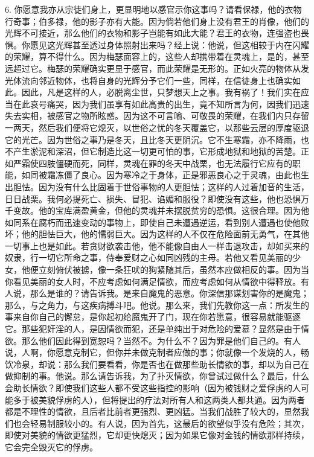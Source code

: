 6. 你愿意我亦从宗徒们身上，更显明地以感官示你这事吗？请看保禄，他的衣物行奇事；伯多禄，他的影子亦有大能。因为倘若他们身上没有君王的肖像，他们的光辉不可接近，那么他们的衣物和影子岂能有如此大能？君王的衣物，连强盗也畏惧。你愿见这光辉甚至透过身体照射出来吗？经上说：他说，但这相较于内在闪耀的荣耀，算不得什么。因为梅瑟面容上的，这些人却携带着在灵魂上，是的，甚至远超过它。梅瑟的荣耀确实更显于感官，而此荣耀是无形的。正如火亮的物体从发光体流向邻近物体，也将自身的光辉分予它们一些，同样，在信徒身上也确实如此。因此，凡是这样的人，必脱离尘世，只梦想天上之事。我有祸了！我们实在应当在此哀号痛哭，因为我们虽享有如此高贵的出生，竟不知所言为何，因我们迅速失去实相，被感官之物所眩惑。因为这不可言喻、可敬畏的荣耀，在我们内只存留一两天，然后我们便将它熄灭，以世俗之忧的冬天覆盖它，以那些云层的厚度驱退它的光芒。因为世俗之事乃是冬天，且比冬天更阴沉。它不生寒霜，亦不降雨，也不产生淤泥和深沼，但它制造比这一切更可怕的事，它形成地狱和地狱的苦楚。正如严霜使四肢僵硬而死，同样，灵魂在罪的冬天中战栗，也无法履行它应有的职能，如同被霜冻僵了良心。因为寒冷之于身体，正是邪恶良心之于灵魂，由此也生出胆怯。因为没有什么比固着于世俗事物的人更胆怯；这样的人过着加音的生活，日日战栗。我何必提死亡、损失、冒犯、谄媚和服役？即使没有这些，他也恐惧万千变故。他的宝库满盈黄金，但他的灵魂并未摆脱贫穷的恐惧。这很合理。因为他如同系在腐朽而迅速变动的事物上，即使自己未遭遇逆运，看到别人遭遇也使他败坏；他的胆怯巨大，他的懦弱巨大。因为这样的人不仅在危险面前无勇气，在其他一切事上也是如此。若贪财欲袭击他，他不能像自由人一样击退攻击，却如买来的奴隶，行一切它所命之事，侍奉爱财之心如同凶残的主母。若他又看见美丽的少女，他便立刻俯伏被掳，像一条狂吠的狗紧随其后，虽然本应做相反的事。因为当你看见美丽的女人时，不应考虑如何满足情欲，而应考虑如何从情欲中得释放。有人说，那么是谁的？请告诉我。是来自魔鬼的恶意。你深信那谋划害你的是魔鬼；那么，与之角力，与这疾病搏斗吧。他说。那么来，我们先教你这一点：所发生的事来自你自己的懈怠，是你起初给魔鬼开了门，现在你若愿意，很容易就能驱逐它。那些犯奸淫的人，是因情欲而犯，还是单纯出于对危险的爱慕？显然是由于情欲。那么他们因此得到宽恕吗？当然不。为什么不？因为罪是他们自己的。有人说，人啊，你愿意克制它，但你并未做克制者应做的事；你就像一个发烧的人，畅饮冷泉，却说：那么我们要看看，你是否也在做那些助长情欲的事，却以为自己在做抑制的事。他说。那么请告诉我，为了扑灭情欲，你曾试过做什么？最后，什么会助长情欲？即使我们这些人都不受这些指控的影响（因为被钱财之爱俘虏的人可能多于被美貌俘虏的人），但将提出的疗法对所有人和这两类人都共通。因为两者都是不理性的情欲，且后者比前者更强烈、更凶猛。当我们战胜了较大的，显然我们也会轻易制服较小的。有人说，因为首先，这最后的欲望似乎没有危险；其次，即使对美貌的情欲更猛烈，它却更快熄灭；因为如果它像对金钱的情欲那样持续，它会完全毁灭它的俘虏。\par

